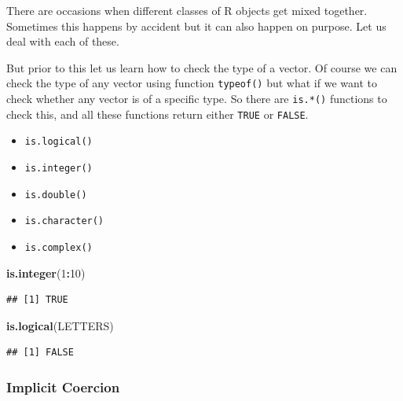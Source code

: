 \documentclass[
]{book}
\newenvironment{Shaded}{\begin{snugshade}}{\end{snugshade}}
\newcommand{\DecValTok}[1]{\textcolor[rgb]{0.00,0.00,0.81}{#1}}
\newcommand{\FunctionTok}[1]{\textcolor[rgb]{0.13,0.29,0.53}{\textbf{#1}}}
\newcommand{\NormalTok}[1]{#1}
\newcommand{\SpecialCharTok}[1]{\textcolor[rgb]{0.81,0.36,0.00}{\textbf{#1}}}
\providecommand{\tightlist}{%
  \setlength{\itemsep}{0pt}\setlength{\parskip}{0pt}}
\begin{document}
There are occasions when different classes of R objects get mixed together. Sometimes this happens by accident but it can also happen on purpose. Let us deal with each of these.

But prior to this let us learn how to check the type of a vector. Of course we can check the type of any vector using function \texttt{typeof()} but what if we want to check whether any vector is of a specific type. So there are \texttt{is.*()} functions to check this, and all these functions return either \texttt{TRUE} or \texttt{FALSE}.

\begin{itemize}
\tightlist
\item
  \texttt{is.logical()}
\item
  \texttt{is.integer()}
\item
  \texttt{is.double()}
\item
  \texttt{is.character()}
\item
  \texttt{is.complex()}
\end{itemize}

\begin{Shaded}
\begin{Highlighting}[]
\FunctionTok{is.integer}\NormalTok{(}\DecValTok{1}\SpecialCharTok{:}\DecValTok{10}\NormalTok{)}
\end{Highlighting}
\end{Shaded}

\begin{verbatim}
## [1] TRUE
\end{verbatim}

\begin{Shaded}
\begin{Highlighting}[]
\FunctionTok{is.logical}\NormalTok{(LETTERS)}
\end{Highlighting}
\end{Shaded}

\begin{verbatim}
## [1] FALSE
\end{verbatim}

\hypertarget{implicit-coercion}{%
\subsubsection*{Implicit Coercion}\label{implicit-coercion}}
\end{document}
